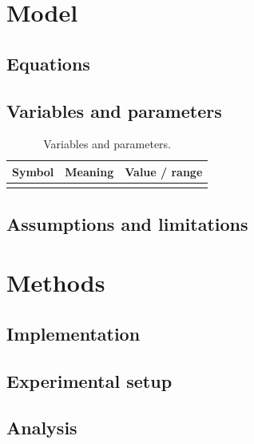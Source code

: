 \documentclass[11pt,a4paper]{article}
\begin{document}
\section{Model}
\subsection{Equations}

\subsection{Variables and parameters}
\begin{table}[h]
  \centering
  \begin{tabular}{@{}lll@{}}
    \toprule
    Symbol & Meaning & Value / range \\
    \midrule
           &         &               \\
    \bottomrule
  \end{tabular}
  \caption{Variables and parameters.}
\end{table}

\subsection{Assumptions and limitations}

\section{Methods}
\subsection{Implementation}

\subsection{Experimental setup}

\subsection{Analysis}
\end{document}
